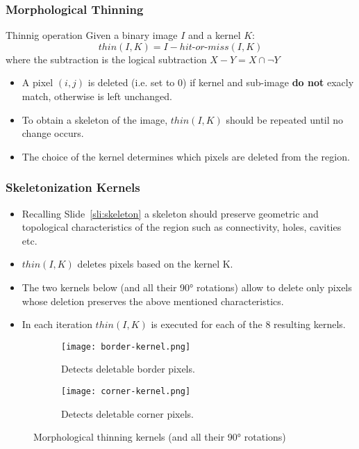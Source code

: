 \begin{frame}[c]
  \frametitle{Morphological Thinning}
  \begin{block}
    {Thinnig operation}
    Given a binary image $I$ and a kernel $K$:
    \begin{equation}
      thin(I, K) = I - hit\mbox{-}or\mbox{-}miss(I, K)
    \end{equation}
    where the subtraction is the logical subtraction $X-Y = X \cap \neg Y$
  \end{block}
  \begin{itemize}
    \item A pixel $(i, j)$ is deleted (i.e. set to 0) if kernel and sub-image \textbf{do not} exacly match, otherwise is left unchanged.
    \item To obtain a skeleton of the image, $thin(I, K)$ should be repeated until no change occurs.
    \item The choice of the kernel determines which pixels are deleted from the region.
  \end{itemize}
\end{frame}

\begin{frame}
  \frametitle{Skeletonization Kernels}
  \begin{itemize}
    \item Recalling Slide~\ref{sli:skeleton} a skeleton should preserve geometric and topological characteristics of the region such as connectivity, holes, cavities etc.
    \item $thin(I, K)$ deletes pixels based on the kernel K.
    \item The two kernels below (and all their 90° rotations) allow to delete only pixels whose deletion preserves the above mentioned characteristics.
    \item In each iteration $thin(I, K)$ is executed for each of the 8 resulting kernels.
  \end{itemize}
  \begin{figure}
    \centering
    \begin{subfigure}[b]{0.45\textwidth}
      \centering
      \texttt{[image: border-kernel.png]}
      \caption{Detects deletable border pixels.}
    \end{subfigure}
    \hfill
    \begin{subfigure}[b]{0.45\textwidth}
      \centering
      \texttt{[image: corner-kernel.png]}
      \caption{Detects deletable corner pixels.}
    \end{subfigure}
    \caption{Morphological thinning kernels (and all their 90° rotations)}
  \end{figure}
\end{frame}

